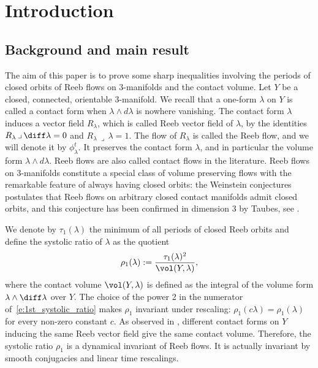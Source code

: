 \section{Introduction}
\label{s:introduction}

\subsection{Background and main result}
The aim of this paper is to prove some sharp inequalities involving the periods of closed orbits of Reeb flows on $3$-manifolds and the contact volume.
Let $Y$ be a closed, connected, orientable $3$-manifold. We recall that a one-form $\lambda$ on $Y$ is called a contact form when $\lambda\wedge d\lambda$ is nowhere vanishing. The contact form $\lambda$ induces a vector field $R_{\lambda}$, which is called Reeb vector field of $\lambda$, by the identities $R_{\lambda} \,\lrcorner\, \diff\lambda = 0$ and $R_{\lambda} \,\lrcorner\, \lambda=1$.
The flow of $R_{\lambda}$ is called the Reeb flow, and we will denote it by $\phi_{\lambda}^t$. It preserves the contact form $\lambda$, and in particular the volume form $\lambda\wedge d\lambda$. Reeb flows are also called contact flows in the literature. Reeb flows on $3$-manifolds constitute a special class of volume preserving flows with the remarkable feature of always having closed orbits: the Weinstein conjectures postulates that Reeb flows on arbitrary closed contact manifolds admit closed orbits, and this conjecture has been confirmed in dimension $3$ by Taubes, see \cite{Taubes:2007wi}.

We denote by $\tau_1(\lambda)$ the minimum of all periods of closed Reeb orbits and define the systolic ratio of $\lambda$ as the quotient
\begin{equation}
\label{e:1st_systolic_ratio}
\rho_1(\lambda) := \frac{\tau_1(\lambda)^2}{\vol(Y,\lambda)},
\end{equation}
where the contact volume $\vol(Y,\lambda)$ is defined as the integral of the volume form $\lambda\wedge \diff\lambda$ over $Y$. The choice of the power 2 in the numerator of~\eqref{e:1st_systolic_ratio} makes $\rho_1$ invariant under rescaling: $\rho_1(c\lambda) = \rho_1(\lambda)$ for every non-zero constant $c$. As observed in \cite[Lem.\,2.1]{Croke:1994}, different contact forms on $Y$ inducing the same Reeb vector field give the same contact volume. Therefore, the systolic ratio $\rho_1$ is a dynamical invariant of Reeb flows. It is actually invariant by smooth conjugacies and linear time rescalings.

